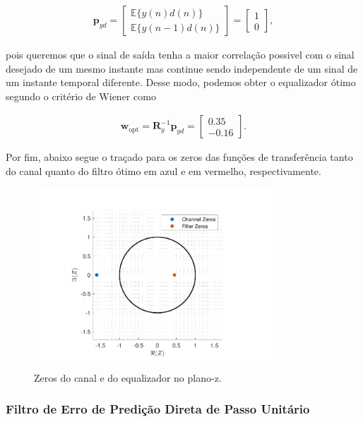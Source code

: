 \begin{align}
    \mathbf{p}_{yd} =
    \begin{bmatrix}
        \mathbb{E}\{y(n)d(n)\} \\
        \mathbb{E}\{y(n - 1)d(n)\}
    \end{bmatrix} = 
    \begin{bmatrix}
        1 \\
        0
    \end{bmatrix},
\end{align}

pois queremos que o sinal de saída tenha a maior correlação possivel com o sinal desejado de um mesmo instante mas continue sendo independente de um sinal de um instante temporal diferente.
Desse modo, podemos obter o equalizador ótimo segundo o critério de Wiener como

\begin{align}
    \mathbf{w}_{\text{opt}} = \mathbf{R}^{-1}_{y} \mathbf{p}_{yd} = \begin{bmatrix}
        0.35 \\
        -0.16
    \end{bmatrix}.
\end{align}

Por fim, abaixo segue o traçado para os zeros das funções de transferência tanto do canal quanto do filtro ótimo em azul e em vermelho, respectivamente.

\begin{figure}[!htp]
    \centering
    \includegraphics[width=0.8\textwidth]{fig/hw3p4-zeros.pdf}
    \caption{Zeros do canal e do equalizador no plano-z.}
\end{figure}


\subsubsection{Filtro de Erro de Predição Direta de Passo Unitário}
    

